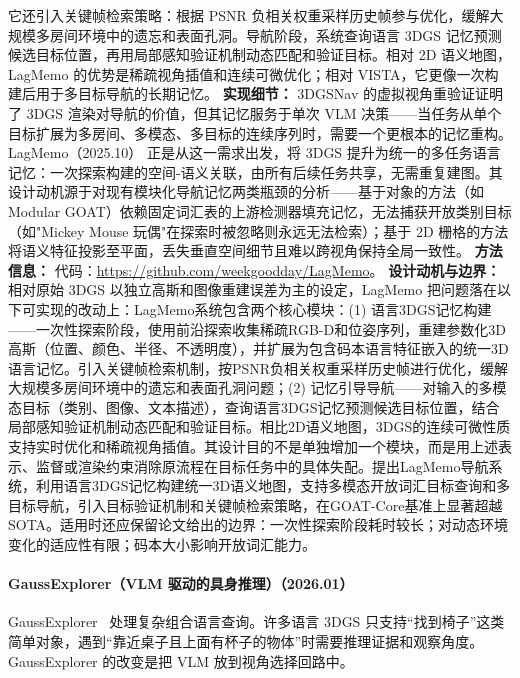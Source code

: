 它还引入关键帧检索策略：根据 PSNR 负相关权重采样历史帧参与优化，缓解大规模多房间环境中的遗忘和表面孔洞。导航阶段，系统查询语言 3DGS 记忆预测候选目标位置，再用局部感知验证机制动态匹配和验证目标。相对 2D 语义地图，LagMemo 的优势是稀疏视角插值和连续可微优化；相对 VISTA，它更像一次构建后用于多目标导航的长期记忆。
\textbf{实现细节：} 3DGSNav 的虚拟视角重验证证明了 3DGS 渲染对导航的价值，但其记忆服务于单次 VLM 决策——当任务从单个目标扩展为多房间、多模态、多目标的连续序列时，需要一个更根本的记忆重构。LagMemo（2025.10） 正是从这一需求出发，将 3DGS 提升为统一的多任务语言记忆：一次探索构建的空间-语义关联，由所有后续任务共享，无需重复建图。其设计动机源于对现有模块化导航记忆两类瓶颈的分析——基于对象的方法（如 Modular GOAT）依赖固定词汇表的上游检测器填充记忆，无法捕获开放类别目标（如"Mickey Mouse 玩偶"在探索时被忽略则永远无法检索）；基于 2D 栅格的方法将语义特征投影至平面，丢失垂直空间细节且难以跨视角保持全局一致性。
\textbf{方法信息：} 代码：\url{https://github.com/weekgoodday/LagMemo}。
\textbf{设计动机与边界：} 相对原始 3DGS 以独立高斯和图像重建误差为主的设定，LagMemo 把问题落在以下可实现的改动上：LagMemo系统包含两个核心模块：(1) 语言3DGS记忆构建——一次性探索阶段，使用前沿探索收集稀疏RGB-D和位姿序列，重建参数化3D高斯（位置、颜色、半径、不透明度），并扩展为包含码本语言特征嵌入的统一3D语言记忆。引入关键帧检索机制，按PSNR负相关权重采样历史帧进行优化，缓解大规模多房间环境中的遗忘和表面孔洞问题；(2) 记忆引导导航——对输入的多模态目标（类别、图像、文本描述），查询语言3DGS记忆预测候选目标位置，结合局部感知验证机制动态匹配和验证目标。相比2D语义地图，3DGS的连续可微性质支持实时优化和稀疏视角插值。其设计目的不是单独增加一个模块，而是用上述表示、监督或渲染约束消除原流程在目标任务中的具体失配。提出LagMemo导航系统，利用语言3DGS记忆构建统一3D语义地图，支持多模态开放词汇目标查询和多目标导航，引入目标验证机制和关键帧检索策略，在GOAT-Core基准上显著超越SOTA。适用时还应保留论文给出的边界：一次性探索阶段耗时较长；对动态环境变化的适应性有限；码本大小影响开放词汇能力。
\paragraph{GaussExplorer（VLM 驱动的具身推理）（2026.01）}
GaussExplorer~\cite{2601_13132} 处理复杂组合语言查询。许多语言 3DGS 只支持“找到椅子”这类简单对象，遇到“靠近桌子且上面有杯子的物体”时需要推理证据和观察角度。GaussExplorer 的改变是把 VLM 放到视角选择回路中。

